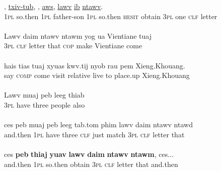 \documentclass[output=paper]{LSP/langsci}
\begin{document}
\begin{exe}
\ex \label{Jaex:19af}
\begin{xlist}
\ex \label{Jaex:19a}
\gll \underline{} \underline{}, \underline{} \underline{txiv-tub}, \underline{} \underline{},     \underline{aws}, \underline{} \underline{lawv} \underline{ib}     \underline{}  \underline{ntawv}.\\
\textsc{1pl} so.then \textsc{1pl} father-son \textsc{1pl} so.then \textsc{hesit} obtain \textsc{3pl} one \textsc{clf} letter\\
\glt {}\\
\ex \label{Jaex:19b}
\gll Lawv daim ntawv ntawm yog ua Vientiane tuaj\\
 \textsc{3pl} \textsc{clf} letter that \textsc{cop} make  Vientiane come\\ 
\glt {}\\
\ex \label{Jaex:19c}
\gll hais tias tuaj xyuas  kwv.tij nyob rau pem Xieng.Khouang.\\		
say \textsc{comp} come visit  relative live to place.up Xieng.Khouang\\ 
\glt {}\\
\ex \label{Jaex:19d}
\gll Lawv muaj peb  leeg  thiab\\
     \textsc{3pl} have three people also \\ 
\glt {}\\
\ex \label{Jaex:19e}
\gll ces peb muaj peb leeg tab.tom phim  lawv daim ntawv ntawd\\
     and.then \textsc{1pl} have three \textsc{clf} just  match \textsc{3pl} \textsc{clf} letter  that\\ 
\glt {}\\
\ex \label{Jaex:19f}
\gll ces \textbf{peb} \textbf{thiaj}  \textbf{yuav} \textbf{lawv} \textbf{daim} \textbf{ntawv} \textbf{ntawm}, ces...\\		           
 and.then  \textsc{1pl} so.then obtain \textsc{3pl} \textsc{clf} letter  that  and.then\\
\glt {} \citep[][227]{fuller85}
\end{xlist}
\end{exe}
\end{document}
